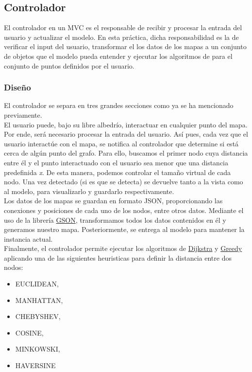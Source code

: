 \subsection{Controlador}
El controlador en un MVC es el responsable de recibir y procesar la entrada del usuario y actualizar el modelo. En esta práctica, dicha responsabilidad es la de  verificar el input del usuario, transformar el los datos de los mapas a un conjunto de objetos que el modelo pueda entender y ejecutar los algoritmos de  para el conjunto de puntos definidos por el usuario.

\subsubsection{Diseño}
El controlador se separa en tres grandes secciones como ya se ha mencionado previamente. \\

El usuario puede, bajo su libre albedrío, interactuar en cualquier punto del mapa. Por ende, será necesario procesar la entrada del usuario. Así pues, cada vez que el usuario interactúe con el mapa, se notifica al controlador que determine si está cerca de algún punto del grafo. Para ello, buscamos el primer nodo cuya distancia entre él y el punto interactuado con el usuario sea menor que una distancia predefinida \textit{x}. De esta manera, podemos controlar el tamaño virtual de cada nodo. Una vez detectado (si es que se detecta) se devuelve tanto a la vista como al modelo, para visualizarlo y guardarlo respectivamente.\\

Los datos de los mapas se guardan en formato JSON, proporcionando las conexiones y posiciones de cada uno de los nodos, entre otros datos. Mediante el uso de la librería \href{https://github.com/google/gson}{GSON}, transformamos todos los datos contenidos en él y generamos nuestro mapa. Posteriormente, se entrega al modelo para mantener la instancia actual.\\

Finalmente, el controlador permite ejecutar los algoritmos de \href{https://en.wikipedia.org/wiki/Dijkstra%27s_algorithm}{Dijkstra} y \href{https://en.wikipedia.org/wiki/Greedy_algorithm}{Greedy} aplicando una de las siguientes heuristicas para definir la distancia entre dos nodos:\\

\begin{itemize}
    \item EUCLIDEAN,
    \item MANHATTAN,
    \item CHEBYSHEV,
    \item COSINE,
    \item MINKOWSKI,
    \item HAVERSINE
\end{itemize}\bigskip

